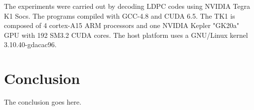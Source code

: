 \documentclass[conference]{IEEEtran}
\begin{document}
The experiments were carried out by decoding LDPC codes using NVIDIA Tegra K1 Socs. The programs compiled with GCC-4.8 and CUDA 6.5. The TK1 is composed of 4 cortex-A15 ARM processors and one NVIDIA Kepler "GK20a" GPU with 192 SM3.2 CUDA cores. The host platform uses a GNU/Linux kernel 3.10.40-gdacac96. 

\section{Conclusion}
The conclusion goes here.

\newpage






\end{document}
